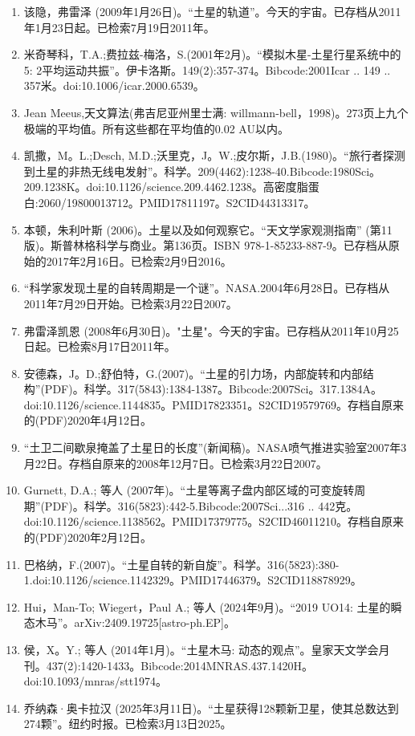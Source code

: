 \begin{enumerate}
\item 该隐，弗雷泽 (2009年1月26日)。“土星的轨道”。今天的宇宙。已存档从2011年1月23日起。已检索7月19日2011年。
\item 米奇琴科，T.A.;费拉兹-梅洛，S.(2001年2月)。“模拟木星-土星行星系统中的5: 2平均运动共振”。伊卡洛斯。149(2):357-374。Bibcode:2001Icar .. 149 .. 357米。doi:10.1006/icar.2000.6539。
\item Jean Meeus,天文算法(弗吉尼亚州里士满: willmann-bell，1998)。273页上九个极端的平均值。所有这些都在平均值的0.02 AU以内。
\item 凯撒，M。L.;Desch, M.D.;沃里克，J。W.;皮尔斯，J.B.(1980)。“旅行者探测到土星的非热无线电发射”。科学。209(4462):1238-40.Bibcode:1980Sci。209.1238K。doi:10.1126/science.209.4462.1238。高密度脂蛋白:2060/19800013712。PMID17811197。S2CID44313317。  
\item 本顿，朱利叶斯 (2006)。土星以及如何观察它。“天文学家观测指南” (第11版)。斯普林格科学与商业。第136页。ISBN 978-1-85233-887-9。已存档从原始的2017年2月16日。已检索2月9日2016。
\item “科学家发现土星的自转周期是一个谜”。NASA.2004年6月28日。已存档从2011年7月29日开始。已检索3月22日2007。
\item 弗雷泽凯恩 (2008年6月30日)。"土星"。今天的宇宙。已存档从2011年10月25日起。已检索8月17日2011年。
\item 安德森，J。D.;舒伯特，G.(2007)。“土星的引力场，内部旋转和内部结构”(PDF)。科学。317(5843):1384-1387。Bibcode:2007Sci。317.1384A。doi:10.1126/science.1144835。PMID17823351。S2CID19579769。存档自原来的(PDF)2020年4月12日。   
\item “土卫二间歇泉掩盖了土星日的长度”(新闻稿)。NASA喷气推进实验室2007年3月22日。存档自原来的2008年12月7日。已检索3月22日2007。
\item Gurnett, D.A.; 等人 (2007年)。“土星等离子盘内部区域的可变旋转周期”(PDF)。科学。316(5823):442-5.Bibcode:2007Sci...316 .. 442克。doi:10.1126/science.1138562。PMID17379775。S2CID46011210。存档自原来的(PDF)2020年2月12日。   
\item 巴格纳，F.(2007)。“土星自转的新自旋”。科学。316(5823):380-1.doi:10.1126/science.1142329。PMID17446379。S2CID118878929。  
\item Hui，Man-To; Wiegert，Paul A.; 等人 (2024年9月)。“2019 UO14: 土星的瞬态木马”。arXiv:2409.19725[astro-ph.EP]。
\item 侯，X。Y.; 等人 (2014年1月)。“土星木马: 动态的观点”。皇家天文学会月刊。437(2):1420-1433。Bibcode:2014MNRAS.437.1420H。doi:10.1093/mnras/stt1974。
\item 乔纳森·奥卡拉汉 (2025年3月11日)。“土星获得128颗新卫星，使其总数达到274颗”。纽约时报。已检索3月13日2025。

\end{enumerate}
